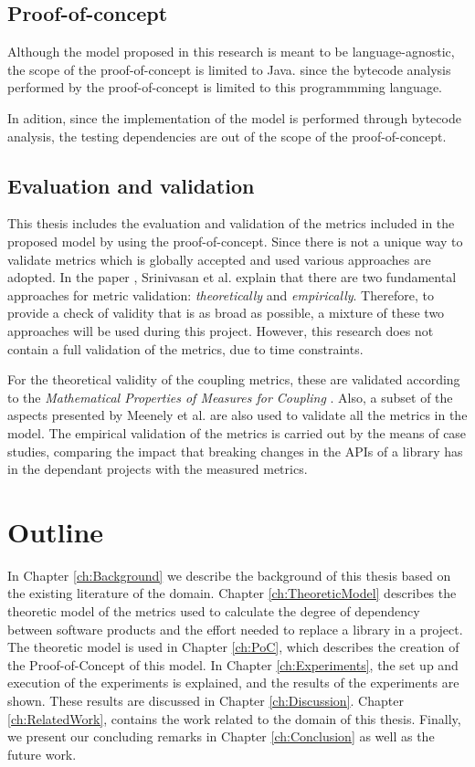 \subsection{Proof-of-concept}
Although the model proposed in this research is meant to be language-agnostic, the scope of the proof-of-concept is limited to Java. since the bytecode analysis performed by the proof-of-concept is limited to this programmming language.

In adition, since the implementation of the model is performed through bytecode analysis, the testing dependencies are out of the scope of the proof-of-concept.

\subsection{Evaluation and validation}
This thesis includes the evaluation and validation of the metrics included in the proposed model by using the proof-of-concept. Since there is not a unique way to validate metrics which is globally accepted and used various approaches are adopted. In the paper \cite{srinivasan2014software}, Srinivasan et al. explain that there are two fundamental approaches for metric validation: \textit{theoretically} and \textit{empirically}. Therefore, to provide a check of validity that is as broad as possible, a mixture of these two approaches will be used during this project. However, this research does not contain a full validation of the metrics, due to time constraints.

For the theoretical validity of the coupling metrics, these are validated according to the \textit{Mathematical Properties of Measures for Coupling} \cite{srinivasan2014software}. Also, a subset of the aspects presented by Meenely et al. \cite{meneely2013validating} are also used to validate all the metrics in the model.
The empirical validation of the metrics is carried out by the means of case studies, comparing the impact that breaking changes in the APIs of a library has in the dependant projects with the measured metrics.

\section{Outline}
In Chapter \ref{ch:Background} we describe the background of this thesis based on the existing literature of the domain.
Chapter \ref{ch:TheoreticModel} describes the theoretic model of the metrics used to calculate the degree of dependency between software products and the effort needed to replace a library in a project.
The theoretic model is used in Chapter \ref{ch:PoC}, which describes the creation of the Proof-of-Concept of this model.
In Chapter \ref{ch:Experiments}, the set up and execution of the experiments is explained, and the results of the experiments are shown. These results are discussed in Chapter \ref{ch:Discussion}. Chapter \ref{ch:RelatedWork}, contains the work related to the domain of this thesis.
Finally, we present our concluding remarks in Chapter \ref{ch:Conclusion} as well as the future work.
